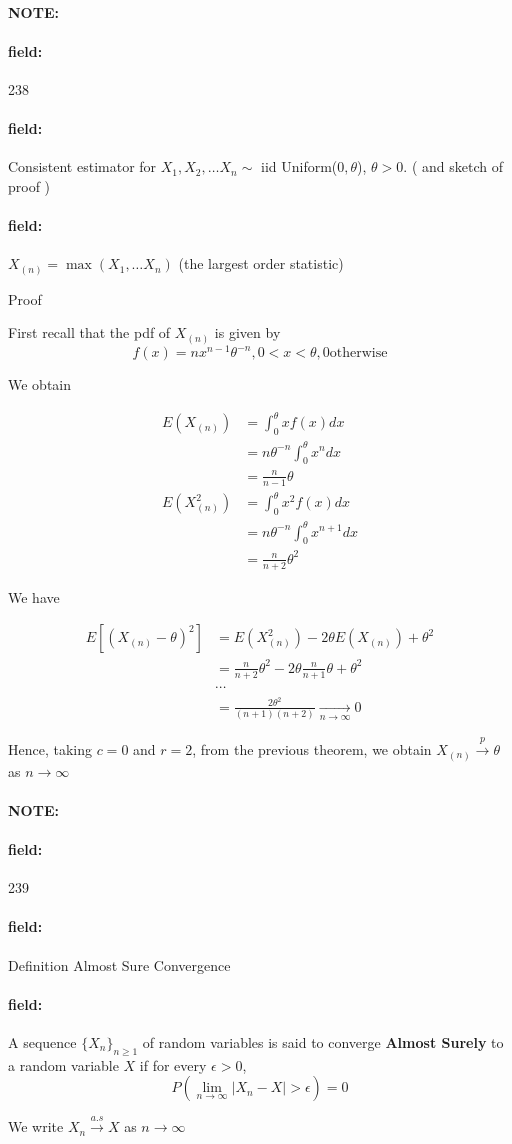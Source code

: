 \documentclass[12pt]{article}
\newenvironment{note}{\paragraph{NOTE:}}{}
\newenvironment{field}{\paragraph{field:}}{}
\begin{document}
\begin{note} \begin{field} \tiny 238 \end{field}
  \begin{field}
    Consistent estimator for $X_1, X_2, \ldots X_n \sim $ iid Uniform($0,\theta$), $\theta > 0$. ( and sketch of proof )
  \end{field}
  \begin{field}
    $X_{(n)} = \max(X_1, \ldots X_n)$ (the largest order statistic)

    Proof

    First recall that the pdf of $X_{(n)}$ is given by $$f(x) = nx^{n-1} \theta^{-n}, 0 < x < \theta, 0 \text{otherwise} $$

    We obtain

    \begin{align*}
      E(X_{(n)}) &= \int_{0}^\theta x f(x) dx \\
      &= n \theta^{-n} \int_0^\theta x^n dx \\
      &= \frac{n}{n-1}\theta\\
      E(X_{(n)}^2) &= \int_0^\theta x^2f(x)dx \\
      &= n\theta^{-n} \int_0^\theta x^{n+1}dx \\
      &= \frac{n}{n + 2} \theta^2
    \end{align*}

    We have

    \begin{align*}
      E[(X_{(n)} - \theta)^2] &= E(X_{(n)}^2) - 2\theta E(X_{(n)}) + \theta^2 \\
      &= \frac{n}{n + 2}\theta^2 - 2\theta \frac{n}{n + 1} \theta + \theta^2\\
      &\cdots\\
      &= \frac{2\theta^2}{(n + 1)(n + 2)} \underset{n \to \infty}{\to} 0
    \end{align*}

    Hence, taking $c = 0$ and $r = 2$, from the previous theorem, we obtain $X_{(n)} \overset{p}{\to} \theta$ as $n \to \infty$

  \end{field}
\end{note}



\begin{note} \begin{field} \tiny 239 \end{field}
  \begin{field}
    Definition Almost Sure Convergence
  \end{field}
  \begin{field}
    A sequence $\{X_n\}_{n \geq 1}$ of random variables is said to converge \textbf{Almost Surely} to a random variable $X$ if for every $\epsilon > 0$,
    $$ P(\lim_{n \to \infty}|X_n - X| > \epsilon) = 0$$

    We write $X_n \overset{a.s}{\to} X$ as $n \to \infty$

  \end{field}
\end{note}
\end{document}
